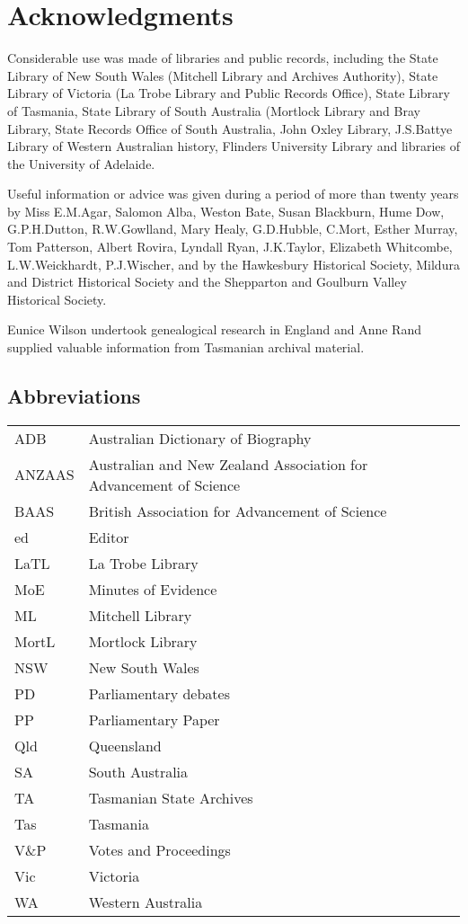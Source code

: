 
\chapter*{Acknowledgments}

Considerable use was made of libraries and public records, including
the State Library of New South Wales (Mitchell Library and Archives
Authority), State Library of Victoria (La Trobe Library and Public
Records Office), State Library of Tasmania, State Library of South
Australia (Mortlock Library and Bray Library, State Records Office of
South Australia, John Oxley Library, J.S.Battye Library of Western
Australian history, Flinders University Library and libraries of the
University of Adelaide.

Useful information or advice was given during a period of more than
twenty years by Miss E.M.Agar, Salomon Alba, Weston Bate, Susan
Blackburn, Hume Dow, G.P.H.Dutton, R.W.Gowlland, Mary Healy,
G.D.Hubble, C.Mort, Esther Murray, Tom Patterson, Albert Rovira,
Lyndall Ryan, J.K.Taylor, Elizabeth Whitcombe, L.W.Weickhardt,
P.J.Wischer, and by the Hawkesbury Historical Society, Mildura and
District Historical Society and the Shepparton and Goulburn Valley
Historical Society.

Eunice Wilson undertook genealogical research in England and Anne Rand
supplied valuable information from Tasmanian archival material.

\section*{Abbreviations} 

\begin{tabular}{ll}
	ADB	& Australian Dictionary of Biography\\
	ANZAAS	& Australian and New Zealand Association for Advancement of
                              Science\\
       	BAAS	& British Association for Advancement of Science\\
	ed	& Editor\\
	LaTL	& La Trobe Library\\
	MoE	& Minutes of Evidence\\
	ML	& Mitchell Library\\
	MortL	& Mortlock Library\\
	NSW	& New South Wales\\
	PD	& Parliamentary debates\\
	PP	& Parliamentary Paper\\
	Qld	& Queensland\\
	SA	& South Australia\\
	TA	& Tasmanian State Archives\\
	Tas	& Tasmania\\
	V\&P	& Votes and Proceedings\\
	Vic	& Victoria\\
	WA	& Western Australia\\
\end{tabular}

